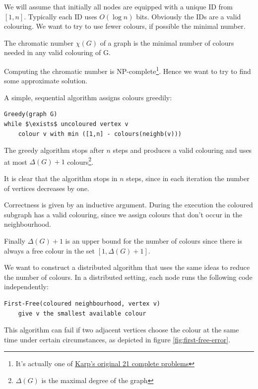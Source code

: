 We will assume that initially all nodes are equipped with a unique ID from $[1,n]$. Typically each ID uses $O(\log n)$ bits. Obviously the IDs are a valid colouring. We want to try to use fewer colours, if possible the minimal number.

\begin{Def} The chromatic number $\chi(G)$ of a graph is the minimal number of colours needed in any valid colouring of G.
\end{Def}

Computing the chromatic number is NP-complete\footnote{It's actually one of \href{http://www.cs.berkeley.edu/~luca/cs172/karp.pdf}{Karp's original 21 complete problems}}. Hence we want to try to find some approximate solution.

A simple, sequential algorithm assigns colours greedily:

\begin{lstlisting}
Greedy(graph G)
while $\exists$ uncoloured vertex v
	colour v with min ([1,n] - colours(neighb(v)))
\end{lstlisting}

\begin{thm} The greedy algorithm stops after $n$ steps and produces a valid colouring and uses at most $\Delta(G)+1$ colours\footnote{$\Delta(G)$ is the maximal degree of the graph}.
\end{thm}

\begin{pr} It is clear that the algorithm stops in $n$ steps, since in each iteration the number of vertices decreases by one. 

Correctness is given by an inductive argument. During the execution the coloured subgraph has a valid colouring, since we assign colours that don't occur in the neighbourhood.

Finally $\Delta(G)+1$ is an upper bound for the number of colours since there is always a free colour in the set $[1,\Delta(G)+1]$.
\end{pr}

We want to construct a distributed algorithm that uses the same ideas to reduce the number of colours. In a distributed setting, each node runs the following code independently:

\begin{lstlisting}
First-Free(coloured neighbourhood, vertex v)
	give v the smallest available colour
\end{lstlisting}

This algorithm can fail if two adjacent vertices choose the colour at the same time under certain circumstances, as depicted in figure \ref{fig:first-free-error}.

